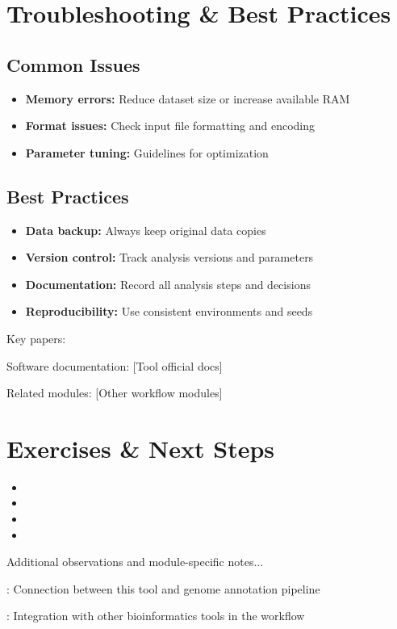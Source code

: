 \documentclass[a4paper,11pt]{article}
\begin{document}
\section{Troubleshooting \& Best Practices}

\subsection{Common Issues}

\begin{itemize}
    \item \textbf{Memory errors:} Reduce dataset size or increase available RAM
    \item \textbf{Format issues:} Check input file formatting and encoding
    \item \textbf{Parameter tuning:} Guidelines for optimization
\end{itemize}

\subsection{Best Practices}
\begin{itemize}
    \item \textbf{Data backup:} Always keep original data copies
    \item \textbf{Version control:} Track analysis versions and parameters
    \item \textbf{Documentation:} Record all analysis steps and decisions
    \item \textbf{Reproducibility:} Use consistent environments and seeds
\end{itemize}

\begin{references}
    \item Key papers: \cite{example2024,author2024,smith2024}
    \item Software documentation: [Tool official docs]
    \item Related modules: [Other workflow modules]
\end{references}

\section{Exercises \& Next Steps}

\begin{itemize}
    \item {}
    \item {}
    \item {}
    \item {}
\end{itemize}

\begin{notes}
Additional observations and module-specific notes...

: Connection between this tool and genome annotation pipeline

: Integration with other bioinformatics tools in the workflow

\end{notes}

\newpage
\printbibliography
\end{document}
